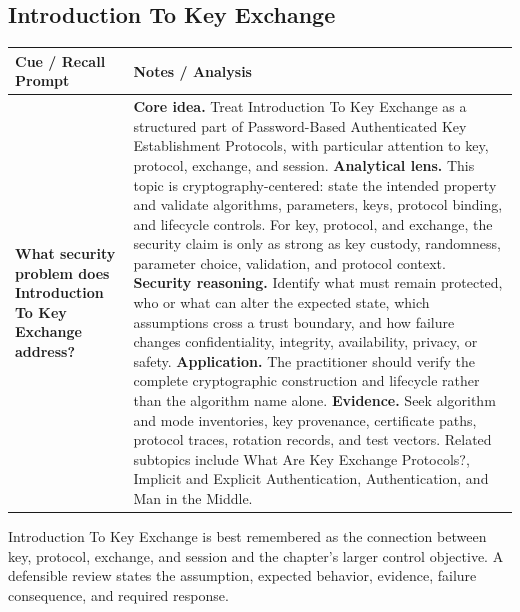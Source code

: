 \documentclass[11pt]{article}
\newcommand{\CornellHeader}{%
\rowcolor{Navy}\color{white}\bfseries Cue / Recall Prompt & \color{white}\bfseries Notes / Analysis\\\hline}
\newcommand{\CornellRow}[2]{%
\cellcolor{CueGray}\RaggedRight\textbf{#1} & \RaggedRight #2\\\hline}
\begin{document}
\subsection*{Introduction To Key Exchange}
\begin{longtable}{>{\RaggedRight\arraybackslash}p{}|>{\RaggedRight\arraybackslash}p{}}
\CornellHeader
\CornellRow{What security problem does Introduction To Key Exchange address?}{\textbf{Core idea.} Treat Introduction To Key Exchange as a structured part of Password-Based Authenticated Key Establishment Protocols, with particular attention to key, protocol, exchange, and session. \textbf{Analytical lens.} This topic is cryptography-centered: state the intended property and validate algorithms, parameters, keys, protocol binding, and lifecycle controls. For key, protocol, and exchange, the security claim is only as strong as key custody, randomness, parameter choice, validation, and protocol context. \textbf{Security reasoning.} Identify what must remain protected, who or what can alter the expected state, which assumptions cross a trust boundary, and how failure changes confidentiality, integrity, availability, privacy, or safety. \textbf{Application.} The practitioner should verify the complete cryptographic construction and lifecycle rather than the algorithm name alone. \textbf{Evidence.} Seek algorithm and mode inventories, key provenance, certificate paths, protocol traces, rotation records, and test vectors. Related subtopics include What Are Key Exchange Protocols?, Implicit and Explicit Authentication, Authentication, and Man in the Middle.}
\end{longtable}
\begin{topicsummary}
Introduction To Key Exchange is best remembered as the connection between key, protocol, exchange, and session and the chapter's larger control objective. A defensible review states the assumption, expected behavior, evidence, failure consequence, and required response.
\end{topicsummary}
\end{document}
